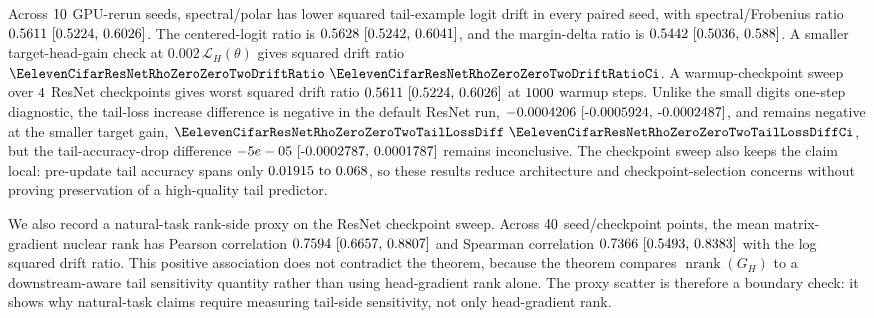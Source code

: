 \documentclass{article}
\theoremstyle{definition}
\newcommand{\Loss}{\mathcal L}
\newcommand{\nrank}{\operatorname{nrank}}
\begin{document}
Across \(10\) GPU-rerun seeds, spectral/polar has lower squared tail-example logit drift in every paired seed, with spectral/Frobenius ratio \(0.5611 ~\text{[0.5224,\hspace{0.35em}0.6026]}\). The centered-logit ratio is \(0.5628 ~\text{[0.5242,\hspace{0.35em}0.6041]}\), and the margin-delta ratio is \(0.5442 ~\text{[0.5036,\hspace{0.35em}0.588]}\). A smaller target-head-gain check at \(0.002\,\Loss_H(\theta)\) gives squared drift ratio \(\EelevenCifarResNetRhoZeroZeroTwoDriftRatio ~\EelevenCifarResNetRhoZeroZeroTwoDriftRatioCi\). A warmup-checkpoint sweep over \(4\) ResNet checkpoints gives worst squared drift ratio \(0.5611 ~\text{[0.5224,\hspace{0.35em}0.6026]}\) at \(1000\) warmup steps. Unlike the small digits one-step diagnostic, the tail-loss increase difference is negative in the default ResNet run, \(-0.0004206 ~\text{[-0.0005924,\hspace{0.35em}-0.0002487]}\), and remains negative at the smaller target gain, \(\EelevenCifarResNetRhoZeroZeroTwoTailLossDiff ~\EelevenCifarResNetRhoZeroZeroTwoTailLossDiffCi\), but the tail-accuracy-drop difference \(-5e-05 ~\text{[-0.0002787,\hspace{0.35em}0.0001787]}\) remains inconclusive. The checkpoint sweep also keeps the claim local: pre-update tail accuracy spans only \(0.01915\text{ to }0.068\), so these results reduce architecture and checkpoint-selection concerns without proving preservation of a high-quality tail predictor.

We also record a natural-task rank-side proxy on the ResNet checkpoint sweep. Across \(40\) seed/checkpoint points, the mean matrix-gradient nuclear rank has Pearson correlation \(0.7594 ~\text{[0.6657,\hspace{0.35em}0.8807]}\) and Spearman correlation \(0.7366 ~\text{[0.5493,\hspace{0.35em}0.8383]}\) with the log squared drift ratio. This positive association does not contradict the theorem, because the theorem compares \(\nrank(G_H)\) to a downstream-aware tail sensitivity quantity rather than using head-gradient rank alone. The proxy scatter is therefore a boundary check: it shows why natural-task claims require measuring tail-side sensitivity, not only head-gradient rank.
\end{document}
